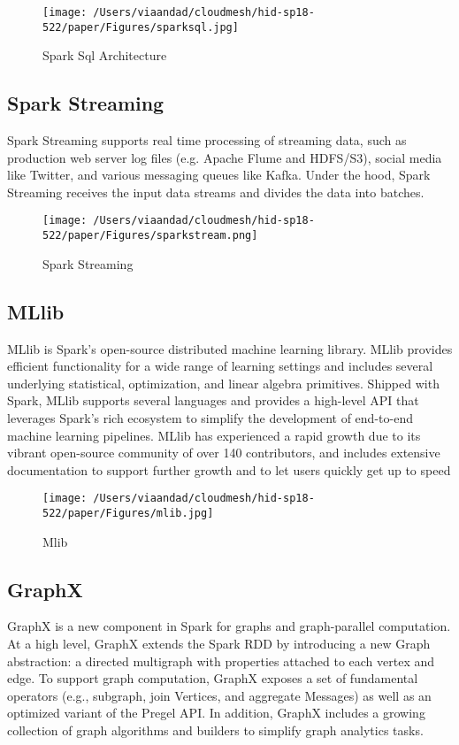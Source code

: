 \documentclass{paper}
\begin{document}
\begin{figure}[H]
	\centering
	\texttt{[image: /Users/viaandad/cloudmesh/hid-sp18-522/paper/Figures/sparksql.jpg]}
	\caption[Optional caption]{Spark Sql Architecture\cite{ref:sql}}
	\label{fig:sparkfeatures}
\end{figure}

\subsection{Spark Streaming}
Spark Streaming supports real time processing of streaming data, such as production web server log files (e.g. Apache Flume and HDFS/S3), social media like Twitter, and various messaging queues like Kafka. Under the hood, Spark Streaming receives the input data streams and divides the data into batches.\cite{ref:topal} \hfill\break

\begin{figure}[H]
	\centering
	\texttt{[image: /Users/viaandad/cloudmesh/hid-sp18-522/paper/Figures/sparkstream.png]}
	\caption[Optional caption]{Spark Streaming  \cite{ref:databricks}}
	\label{fig:sparkfeatures}
\end{figure}

\subsection{MLlib}
MLlib is Spark's open-source distributed machine learning library. MLlib provides efficient functionality for a wide range of learning settings and includes several underlying statistical, optimization, and linear algebra primitives. Shipped with Spark, MLlib supports several languages and provides a high-level API that leverages Spark's rich ecosystem to simplify the development of end-to-end machine learning pipelines. MLlib has experienced a rapid growth due to its vibrant open-source community of over 140 contributors, and includes extensive documentation to support further growth and to let users quickly get up to speed\cite{ref:spark}\hfill\break

\begin{figure}[H]
	\centering
	\texttt{[image: /Users/viaandad/cloudmesh/hid-sp18-522/paper/Figures/mlib.jpg]}
	\caption[Optional caption]{Mlib \cite{ref:databricks}}
	\label{fig:sparkfeatures}
\end{figure}

\subsection{GraphX}
GraphX is a new component in Spark for graphs and graph-parallel computation. At a high level, GraphX extends the Spark RDD by introducing a new Graph abstraction: a directed multigraph with properties attached to each vertex and edge. To support graph computation, GraphX exposes a set of fundamental operators (e.g., subgraph, join Vertices, and aggregate Messages) as well as an optimized variant of the Pregel API. In addition, GraphX includes a growing collection of graph algorithms and builders to simplify graph analytics tasks.\cite{ref:graphx}\hfill\break
\end{document}
